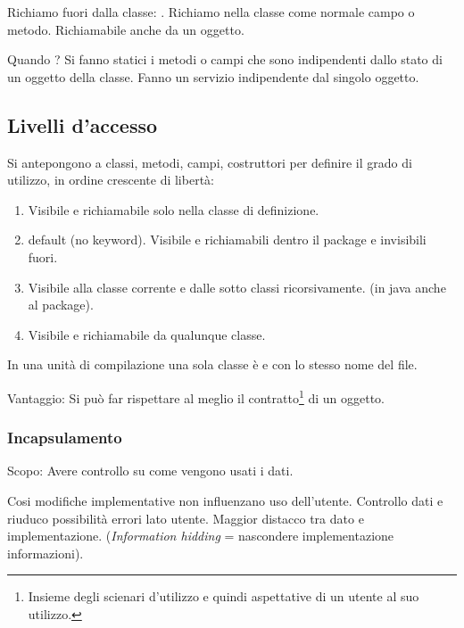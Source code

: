Richiamo fuori dalla classe: .
Richiamo nella classe come normale campo o metodo.
Richiamabile anche da un oggetto.


Quando ?
Si fanno statici i metodi o campi che sono indipendenti dallo stato di un oggetto della classe. Fanno un servizio indipendente dal singolo oggetto.

\subsection{Livelli d'accesso}
Si antepongono a classi, metodi, campi, costruttori per definire il grado di utilizzo, in ordine crescente di libertà:
\begin{enumerate}
	\item {} Visibile e richiamabile solo nella classe di definizione.
	\item {} default (no keyword). Visibile e richiamabili dentro il package e invisibili fuori.
	\item {} Visibile alla classe corrente e dalle sotto classi ricorsivamente. (in java anche al package).
	\item {} Visibile e richiamabile da qualunque classe.
\end{enumerate}

In una unità di compilazione una sola classe è  e con lo stesso nome del file.

Vantaggio: Si può far rispettare al meglio il contratto\footnote{Insieme degli scienari d'utilizzo e quindi aspettative di un utente al suo utilizzo.} di un oggetto.

\subsubsection{Incapsulamento}
\begin{center}
	Scopo: Avere controllo su come vengono usati i dati.
\end{center}


Cosi modifiche implementative non influenzano uso dell'utente. Controllo dati e riuduco possibilità errori lato utente. Maggior distacco tra dato e implementazione. (\textit{Information hidding} = nascondere implementazione informazioni).

